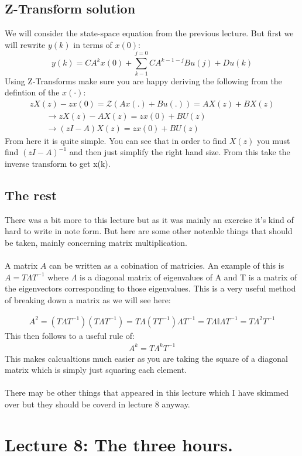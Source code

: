 \documentclass[a4paper,11pt]{article}
\begin{document}
\subsection{Z-Transform solution}
We will consider the state-space equation from the previous lecture. But first we will rewrite $y(k)$ in terms of $x(0)$:
\begin{equation}
    y(k) = CA^kx(0)+\sum\limits_{k-1}^{j=0}CA^{k-1-j}Bu(j) + Du(k)  
\end{equation}
Using Z-Transforms make sure you are happy deriving the following from the defintion of the $x(\cdot)$:
\begin{gather}
	zX(z) - zx(0) = \mathcal{Z}(Ax(.)+Bu(.))= AX(z)+BX(z)\\
	\qquad \rightarrow zX(z)-AX(z)=zx(0)+BU(z)\\
	\qquad \rightarrow (zI - A)X(z)= zx(0)+BU(z)
\end{gather}
From here it is quite simple. You can see that in order to find $X(z)$ you must find $(zI-A)^{-1}$ and then just simplify the right hand size. From this take the inverse transform to get x(k).
\subsection{The rest}
	There was a bit more to this lecture but as it was mainly an exercise it's kind of hard to write in note form. But here are some other noteable things that should be taken, mainly concerning matrix multiplication.\\\\
	A matrix $A$ can be written as a cobination of matricies. An example of this is $A=T\Lambda T^{-1}$ where $\Lambda$ is a diagonal matrix of eigenvalues of A and T is a matrix of the eigenvectors corresponding to those eigenvalues. This is a very useful method of breaking down a matrix as we will see here: 

	\begin{gather}
		A^2=(T\Lambda T^{-1})(T\Lambda T^{-1})=T\Lambda (TT^{-1})\Lambda T^{-1}=T\Lambda \mathbb{I}\Lambda T^{-1} = T\Lambda^2T^{-1}
	\end{gather}
	This then follows to a useful rule of:
	\begin{gather}
		A^k=T\Lambda^kT^{-1}
	\end{gather}
	This makes calcualtions much easier as you are taking the square of a diagonal matrix which is simply just squaring each element.\\\\
	There may be other things that appeared in this lecture which I have skimmed over but they should be coverd in lecture 8 anyway.
\section{Lecture 8: The three hours.}
\end{document}
